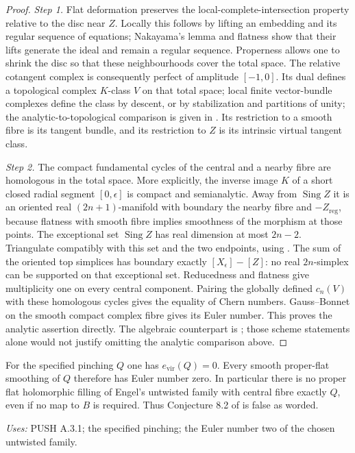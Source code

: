 \begin{proof}
\par\noindent\textit{Step 1.} Flat deformation preserves the local-complete-intersection
property relative to the disc near $Z$. Locally this follows by
lifting an embedding and its regular sequence of equations;
Nakayama's lemma and flatness show that their lifts generate
the ideal and remain a regular sequence. Properness allows one
to shrink the disc so that these neighbourhoods cover the total
space. The relative cotangent complex is consequently perfect
of amplitude $[-1,0]$. Its dual defines a topological complex
$K$-class $V$ on that total space; local finite vector-bundle
complexes define the class by descent, or by stabilization and
partitions of unity; the analytic-to-topological comparison is
given in \cite[Lemmas 3.1--3.2 and Section 3.1]{Levy08}.
Its restriction to a smooth fibre is its
tangent bundle, and its restriction to $Z$ is its intrinsic
virtual tangent class.

\par\noindent\textit{Step 2.} The compact fundamental cycles of the central and a nearby
fibre are homologous in the total space. More explicitly,
the inverse image $K$ of a short closed radial segment
$[0,\epsilon]$ is compact and semianalytic. Away from
$\operatorname{Sing}Z$ it is an oriented real
$(2n+1)$-manifold with boundary the nearby fibre and
$-Z_{\mathrm{reg}}$, because flatness with smooth fibre
implies smoothness of the morphism at those points.
The exceptional set $\operatorname{Sing}Z$ has real
dimension at most $2n-2$. Triangulate compatibly with
this set and the two endpoints, using
\cite[Section 3, Theorems 1--2]{Loj64}. The sum of the
oriented top simplices has boundary exactly
$[X_\epsilon]-[Z]$: no real $2n$-simplex can be supported
on that exceptional set. Reducedness and flatness give
multiplicity one on every central component. Pairing the globally defined
$c_n(V)$ with these homologous cycles gives the equality of
Chern numbers. Gauss--Bonnet on the smooth compact complex
fibre gives its Euler number. This proves the analytic assertion
directly. The algebraic counterpart is \cite[Theorem~5.8 and Remark~5.9]{FG10}; those scheme statements alone would
not justify omitting the analytic comparison above.
\end{proof}

\begin{theorem}[PUSH A.3.2; T]\label{push:A.3.2}
For the specified pinching $Q$ one has $e_{\mathrm{vir}}(Q)=0$.
Every smooth proper-flat smoothing of $Q$ therefore has Euler
number zero. In particular there is no proper flat holomorphic
filling of Engel's untwisted family with central fibre exactly
$Q$, even if no map to $B$ is required. Thus Conjecture 8.2
of \cite[Conjecture~8.2]{E26} is false as worded.
\end{theorem}
\noindent\emph{Uses:} PUSH A.3.1; the specified pinching; the Euler number two of the chosen untwisted family.\par

